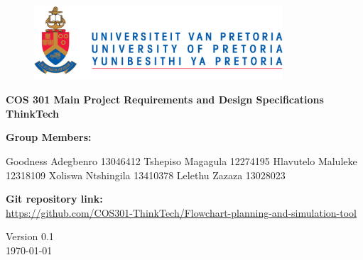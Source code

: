 \begin{titlepage}
	\begin{center}
		
		\begin{figure}[t]
			\centering
			\includegraphics[width=350px]{UP_Logo.png}
		\end{figure}		
	
	
	\begin{flushright} 
		
		\textbf{\LARGE COS 301 Main Project}
		\newline \newline \newline
		\textbf{\LARGE Requirements and Design Specifications}
		\newline \newline \newline
 		\textbf{\LARGE ThinkTech}
		\newline \newline \newline
	\end{flushright}
		
		\vspace{1 cm}
		
		\LARGE{\textbf{Group Members: }}
		

		\begin{flushright} \large			
			Goodness Adegbenro 13046412\newline
			Tshepiso Magagula 12274195\newline
			Hlavutelo Maluleke 12318109\newline			
			Xoliswa Ntshingila 13410378\newline
			Lelethu Zazaza 13028023\newline
		\end{flushright}
		
	
		
		\textbf{Git repository link:\\}
		 \url{https://github.com/COS301-ThinkTech/Flowchart-planning-and-simulation-tool}
		
		\vfill
		
		{\LARGE Version 0.1}
		\\
		{\large \today}		
		
		
	\end{center}
\end{titlepage}
